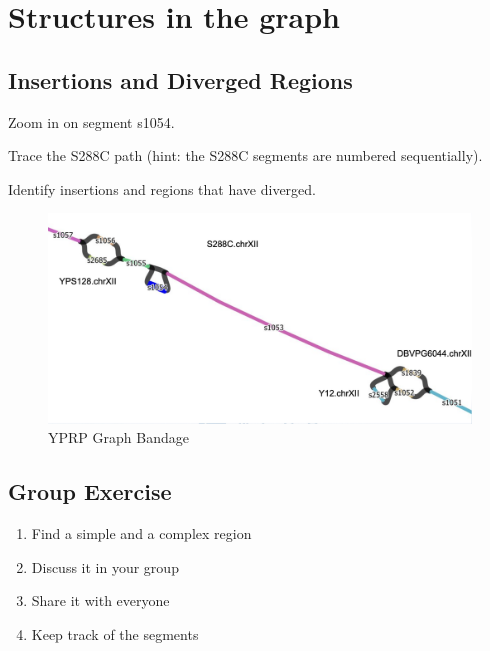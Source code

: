 \documentclass[
]{book}
\providecommand{\tightlist}{%
  \setlength{\itemsep}{0pt}\setlength{\parskip}{0pt}}
\begin{document}
\hypertarget{structures-in-the-graph}{%
\section{Structures in the graph}\label{structures-in-the-graph}}

\hypertarget{insertions-and-diverged-regions}{%
\subsection*{Insertions and Diverged Regions}\label{insertions-and-diverged-regions}}

Zoom in on segment s1054.

Trace the S288C path (hint: the S288C segments are numbered sequentially).

Identify insertions and regions that have diverged.

\begin{figure}
\centering
\includegraphics[width=1\textwidth,height=\textheight]{./Figures/YPRPBandage2.png}
\caption{YPRP Graph Bandage}
\end{figure}

\hypertarget{group-exercise}{%
\subsection*{Group Exercise}\label{group-exercise}}

\begin{enumerate}
\def\labelenumi{\arabic{enumi}.}
\tightlist
\item
  Find a simple and a complex region
\item
  Discuss it in your group
\item
  Share it with everyone
\item
  Keep track of the segments
\end{enumerate}
\end{document}
